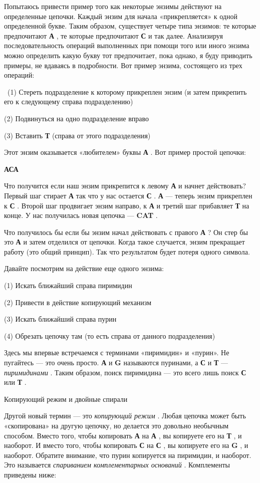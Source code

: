 Попытаюсь привести пример того как некоторые энзимы действуют на определенные цепочки. Каждый энзим для начала «прикрепляется» к одной определенной букве. Таким образом, существует четыре типа энзимов: те которые предпочитают \textbf{А} , те которые предпочитают \textbf{С} и так далее. Анализируя последовательность операций выполненных при помощи того или иного энзима можно определить какую букву тот предпочитает, пока однако, я буду приводить примеры, не вдаваясь в подробности. Вот пример энзима, состоящего из трех операций:

~(1) Стереть подразделение к которому прикреплен энзим (и затем прикрепить его к следующему справа подразделению)

(2) Подвинуться на одно подразделение вправо

(3) Вставить \textbf{Т} (справа от этого подразделения)

Этот энзим оказывается «любителем» буквы \textbf{А} . Вот пример простой цепочки:

\textbf{АСА}

Что получится если наш энзим прикрепится к левому \textbf{А} и начнет действовать? Первый шаг стирает \textbf{А} так что у нас остается \textbf{С} . \textbf{А} --- теперь энзим прикреплен к \textbf{С} . Второй шаг продвигает энзим направо, к \textbf{А} и третий шаг прибавляет \textbf{Т} на конце. У нас получилась новая цепочка --- \textbf{CAT} .

Что получилось бы если бы энзим начал действовать с правого \textbf{А} ? Он стер бы это \textbf{А} и затем отделился от цепочки. Когда такое случается, энзим прекращает работу (это общий принцип). Так что результатом будет потеря одного символа.

Давайте посмотрим на действие еще одного энзима:

(1) Искать ближайший справа пиримидин

(2) Привести в действие копирующий механизм

(3) Искать ближайший справа пурин

(4) Обрезать цепочку там (то есть справа от данного подразделения)

Здесь мы впервые встречаемся с терминами «пиримидин» и «пурин». Не пугайтесь --- это очень просто. \textbf{А} и \textbf{G} называются пуринами, а \textbf{С} и \textbf{Т} --- \emph{пиримидинами} . Таким образом, поиск пиримидина --- это всего лишь поиск \textbf{С} или \textbf{Т} .

Копирующий режим и двойные спирали

Другой новый термин --- это \emph{копирующий режим} . Любая цепочка может быть «скопирована» на другую цепочку, но делается это довольно необычным способом. Вместо того, чтобы копировать \textbf{А} на \textbf{А} , вы копируете его на \textbf{Т} , и наоборот. И вместо того, чтобы копировать \textbf{С} на \textbf{С} , вы копируете его на \textbf{G} , и наоборот. Обратите внимание, что пурин копируется на пиримидин, и наоборот. Это называется \emph{спариванием комплементарных оснований} . Комплементы приведены ниже:

